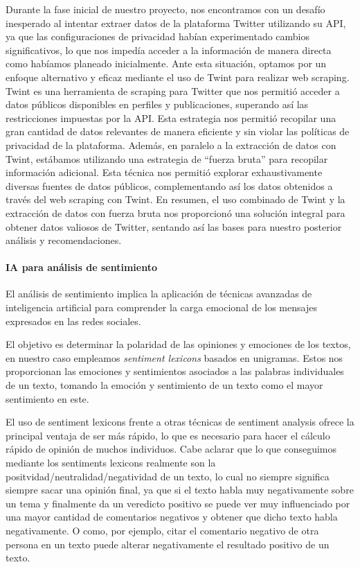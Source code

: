 \documentclass[
  letterpaper,
  DIV=11,
  numbers=noendperiod]{scrartcl}
\let\oldparagraph\paragraph
\renewcommand{\paragraph}[1]{\oldparagraph{#1}\mbox{}}
\begin{document}
Durante la fase inicial de nuestro proyecto, nos encontramos con un
desafío inesperado al intentar extraer datos de la plataforma Twitter
utilizando su API, ya que las configuraciones de privacidad habían
experimentado cambios significativos, lo que nos impedía acceder a la
información de manera directa como habíamos planeado inicialmente. Ante
esta situación, optamos por un enfoque alternativo y eficaz mediante el
uso de Twint para realizar web scraping. Twint es una herramienta de
scraping para Twitter que nos permitió acceder a datos públicos
disponibles en perfiles y publicaciones, superando así las restricciones
impuestas por la API. Esta estrategia nos permitió recopilar una gran
cantidad de datos relevantes de manera eficiente y sin violar las
políticas de privacidad de la plataforma. Además, en paralelo a la
extracción de datos con Twint, estábamos utilizando una estrategia de
``fuerza bruta'' para recopilar información adicional. Esta técnica nos
permitió explorar exhaustivamente diversas fuentes de datos públicos,
complementando así los datos obtenidos a través del web scraping con
Twint. En resumen, el uso combinado de Twint y la extracción de datos
con fuerza bruta nos proporcionó una solución integral para obtener
datos valiosos de Twitter, sentando así las bases para nuestro posterior
análisis y recomendaciones.

\paragraph{IA para análisis de
sentimiento}\label{ia-para-anuxe1lisis-de-sentimiento}

El análisis de sentimiento implica la aplicación de técnicas avanzadas
de inteligencia artificial para comprender la carga emocional de los
mensajes expresados en las redes sociales.

El objetivo es determinar la polaridad de las opiniones y emociones de
los textos, en nuestro caso empleamos \emph{sentiment lexicons} basados
en unigramas. Estos nos proporcionan las emociones y sentimientos
asociados a las palabras individuales de un texto, tomando la emoción y
sentimiento de un texto como el mayor sentimiento en este.

El uso de sentiment lexicons frente a otras técnicas de sentiment
analysis ofrece la principal ventaja de ser más rápido, lo que es
necesario para hacer el cálculo rápido de opinión de muchos individuos.
Cabe aclarar que lo que conseguimos mediante los sentiments lexicons
realmente son la positvidad/neutralidad/negatividad de un texto, lo cual
no siempre significa siempre sacar una opinión final, ya que si el texto
habla muy negativamente sobre un tema y finalmente da un veredicto
positivo se puede ver muy influenciado por una mayor cantidad de
comentarios negativos y obtener que dicho texto habla negativamente. O
como, por ejemplo, citar el comentario negativo de otra persona en un
texto puede alterar negativamente el resultado positivo de un texto.
\end{document}
